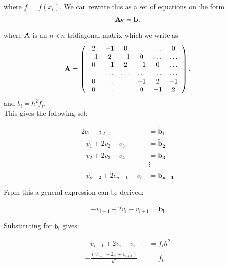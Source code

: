 \documentclass[12pt]{article}
\begin{document}
\noindent where $f_i=f(x_i)$.
We can rewrite this as a set of equations on the form 
\begin{equation}\label{eq:lin_eq}
   {\bf A}{\bf v} = \tilde{{\bf b}},
\end{equation}

\noindent where ${\bf A}$ is an $n\times n$  tridiagonal matrix which we write as 
\begin{equation}
    {\bf A} = \left(\begin{array}{cccccc}
                           2& -1& 0 &\dots   & \dots &0 \\
                           -1 & 2 & -1 &0 &\dots &\dots \\
                           0&-1 &2 & -1 & 0 & \dots \\
                           & \dots   & \dots &\dots   &\dots & \dots \\
                           0&\dots   &  &-1 &2& -1 \\
                           0&\dots    &  & 0  &-1 & 2 \\
                      \end{array} \right),
\end{equation}
and $\tilde{b}_i=h^2f_i$.
\\

\noindent This gives the following set:

\begin{align*}
2v_1 - v_2 &= \mathbf{\tilde{b}_1} \\
-v_1 + 2v_2 - v_3 &= \mathbf{\tilde{b}_2} \\
-v_2 + 2v_3 - v_4 &= \mathbf{\tilde{b}_3} \\
 &\vdots  \\
-v_{n-2} + 2v_{n-1} - v_{n} &= \mathbf{\tilde{b}_{n-1}}
\end{align*}


\noindent From this a general expression can be derived:


\begin{equation*}
-v_{i-1} + 2v_{i} - v_{i+1} = \mathbf{\tilde{b_i}} 
\end{equation*}


\noindent Substituting for $\mathbf{\tilde{b}_i}$ gives:


\begin{align*}
-v_{i-1} + 2v_{i} - v_{i+1} &= f_ih^2 \\
-\frac{(v_{i-1} - 2v_{i} + v_{i+1})}{h^2} &= f_i 
\end{align*}
\end{document}
